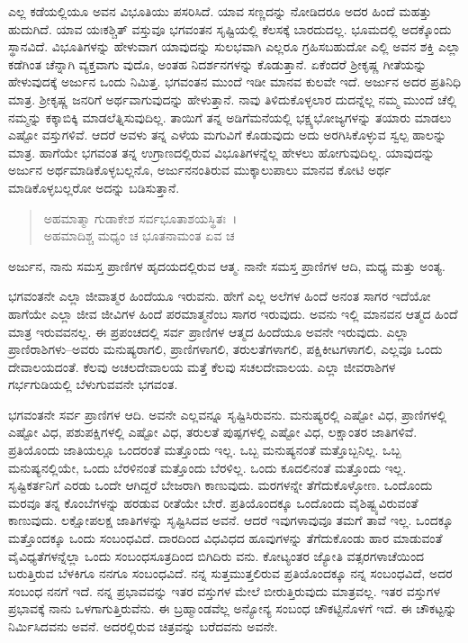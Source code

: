 ಎಲ್ಲ ಕಡೆಯಲ್ಲಿಯೂ ಅವನ ವಿಭೂತಿಯು ಪಸರಿಸಿದೆ. ಯಾವ ಸಣ್ಣದನ್ನು ನೋಡಿದರೂ ಅದರ ಹಿಂದೆ ಮಹತ್ತು ಹುದುಗಿದೆ. ಯಾವ ಯಃಕಶ್ಚಿತ್ ವಸ್ತುವೂ ಭಗವಂತನ ಸೃಷ್ಟಿಯಲ್ಲಿ ಕೆಲಸಕ್ಕೆ ಬಾರದುದಲ್ಲ. ಭೂಮದಲ್ಲಿ ಅದಕ್ಕೊಂದು ಸ್ಥಾನವಿದೆ. ವಿಭೂತಿಗಳನ್ನು ಹೇಳುವಾಗ ಯಾವುದನ್ನು ಸುಲಭವಾಗಿ ಎಲ್ಲರೂ ಗ್ರಹಿಸಬಹುದೋ ಎಲ್ಲಿ ಅವನ ಶಕ್ತಿ ಎಲ್ಲಾ ಕಡೆಗಿಂತ ಚೆನ್ನಾಗಿ ವ್ಯಕ್ತವಾಗು ವುದೊ, ಅಂತಹ ನಿದರ್ಶನಗಳನ್ನು ಕೊಡುತ್ತಾನೆ. ಏಕೆಂದರೆ ಶ‍್ರೀಕೃಷ್ಣ ಗೀತೆಯನ್ನು ಹೇಳುವುದಕ್ಕೆ ಅರ್ಜುನ ಒಂದು ನಿಮಿತ್ತ. ಭಗವಂತನ ಮುಂದೆ ಇಡೀ ಮಾನವ ಕುಲವೇ ಇದೆ. ಅರ್ಜುನ ಅದರ ಪ್ರತಿನಿಧಿ ಮಾತ್ರ. ಶ‍್ರೀಕೃಷ್ಣ ಜನರಿಗೆ ಅರ್ಥವಾಗುವುದನ್ನು ಹೇಳುತ್ತಾನೆ. ನಾವು ತಿಳಿದುಕೊಳ್ಳಲಾರ ದುದನ್ನೆಲ್ಲ ನಮ್ಮ ಮುಂದೆ ಚೆಲ್ಲಿ ನಮ್ಮನ್ನು ಕಕ್ಕಾಬಿಕ್ಕಿ ಮಾಡಲೆತ್ನಿಸುವುದಿಲ್ಲ. ತಾಯಿಗೆ ತನ್ನ ಅಡಿಗೆಮನೆಯಲ್ಲಿ ಭಕ್ಷ್ಯಭೋಜ್ಯಗಳನ್ನು ತಯಾರು ಮಾಡಲು ಎಷ್ಟೋ ವಸ್ತುಗಳಿವೆ. ಆದರೆ ಅವಳು ತನ್ನ ಎಳೆಯ ಮಗುವಿಗೆ ಕೊಡುವುದು ಅದು ಅರಗಿಸಿಕೊಳ್ಳುವ ಸ್ವಲ್ಪ ಹಾಲನ್ನು ಮಾತ್ರ. ಹಾಗೆಯೇ ಭಗವಂತ ತನ್ನ ಉಗ್ರಾಣದಲ್ಲಿರುವ ವಿಭೂತಿಗಳನ್ನೆಲ್ಲ ಹೇಳಲು ಹೋಗುವುದಿಲ್ಲ. ಯಾವುದನ್ನು ಅರ್ಜುನ ಅರ್ಥಮಾಡಿಕೊಳ್ಳಬಲ್ಲನೊ, ಅರ್ಜುನನಂತಿರುವ ಮುಕ್ಕಾಲುಪಾಲು ಮಾನವ ಕೋಟಿ ಅರ್ಥ ಮಾಡಿಕೊಳ್ಳಬಲ್ಲರೋ ಅದನ್ನು ಬಡಿಸುತ್ತಾನೆ.

\begin{verse}
ಅಹಮಾತ್ಮಾ ಗುಡಾಕೇಶ ಸರ್ವಭೂತಾಶಯಸ್ಥಿತಃ~।\\ಅಹಮಾದಿಶ್ಚ ಮಧ್ಯಂ ಚ ಭೂತನಾಮಂತ ಏವ ಚ 
\end{verse}

{\small ಅರ್ಜುನ, ನಾನು ಸಮಸ್ತ ಪ್ರಾಣಿಗಳ ಹೃದಯದಲ್ಲಿರುವ ಆತ್ಮ. ನಾನೇ ಸಮಸ್ತ ಪ್ರಾಣಿಗಳ ಆದಿ, ಮಧ್ಯ ಮತ್ತು ಅಂತ್ಯ.}

ಭಗವಂತನೇ ಎಲ್ಲಾ ಜೀವಾತ್ಮರ ಹಿಂದೆಯೂ ಇರುವನು. ಹೇಗೆ ಎಲ್ಲ ಅಲೆಗಳ ಹಿಂದೆ ಅನಂತ ಸಾಗರ ಇದೆಯೋ ಹಾಗೆಯೇ ಎಲ್ಲಾ ಜೀವ ಜೀವಿಗಳ ಹಿಂದೆ ಪರಮಾತ್ಮನೆಂಬ ಸಾಗರ ಇರುವುದು. ಅವನು ಇಲ್ಲಿ ಮಾನವನ ಆತ್ಮದ ಹಿಂದೆ ಮಾತ್ರ ಇರುವವನಲ್ಲ. ಈ ಪ್ರಪಂಚದಲ್ಲಿ ಸರ್ವ ಪ್ರಾಣಿಗಳ ಆತ್ಮದ ಹಿಂದೆಯೂ ಅವನೇ ಇರುವುದು. ಎಲ್ಲಾ ಪ್ರಾಣಿರಾಶಿಗಳು–ಅವರು ಮನುಷ್ಯರಾಗಲಿ, ಪ್ರಾಣಿಗಳಾಗಲಿ, ತರುಲತೆಗಳಾಗಲಿ, ಪಕ್ಷಿಕೀಟಗಳಾಗಲಿ, ಎಲ್ಲವೂ ಒಂದು ದೇವಾಲಯದಂತೆ. ಕೆಲವು ಅಚಲದೇವಾಲಯ ಮತ್ತೆ ಕೆಲವು ಸಚಲದೇವಾಲಯ. ಎಲ್ಲಾ ಜೀವರಾಶಿಗಳ ಗರ್ಭಗುಡಿಯಲ್ಲಿ ಬೆಳುಗುವವನೇ ಭಗವಂತ.

ಭಗವಂತನೇ ಸರ್ವ ಪ್ರಾಣಿಗಳ ಆದಿ. ಅವನೇ ಎಲ್ಲವನ್ನೂ ಸೃಷ್ಟಿಸಿರುವನು. ಮನುಷ್ಯರಲ್ಲಿ ಎಷ್ಟೋ ವಿಧ, ಪ್ರಾಣಿಗಳಲ್ಲಿ ಎಷ್ಟೋ ವಿಧ, ಪಶುಪಕ್ಷಿಗಳಲ್ಲಿ ಎಷ್ಟೋ ವಿಧ, ತರುಲತೆ ಪುಷ್ಪಗಳಲ್ಲಿ ಎಷ್ಟೋ ವಿಧ, ಲಕ್ಷಾಂತರ ಜಾತಿಗಳಿವೆ. ಪ್ರತಿಯೊಂದು ಜಾತಿಯಲ್ಲೂ ಒಂದರಂತೆ ಮತ್ತೊಂದು ಇಲ್ಲ. ಒಬ್ಬ ಮನುಷ್ಯನಂತೆ ಮತ್ತೊಬ್ಬನಿಲ್ಲ. ಒಬ್ಬ ಮನುಷ್ಯನಲ್ಲಿಯೇ, ಒಂದು ಬೆರಳಿನಂತೆ ಮತ್ತೊಂದು ಬೆರಳಿಲ್ಲ. ಒಂದು ಕೂದಲಿನಂತೆ ಮತ್ತೊಂದು ಇಲ್ಲ. ಸೃಷ್ಟಿಕರ್ತನಿಗೆ ಎರಡು ಒಂದೇ ಆಗಿದ್ದರೆ ಬೇಜರಾಗಿ ಕಾಣುವುದು. ಮರಗಳನ್ನೇ ತೆಗೆದುಕೊಳ್ಳೋಣ. ಒಂದೊಂದು ಮರವೂ ತನ್ನ ಕೊಂಬೆಗಳನ್ನು ಹರಡುವ ರೀತೆಯೇ ಬೇರೆ. ಪ್ರತಿಯೊಂದಕ್ಕೂ ಒಂದೊಂದು ವೈಶಿಷ್ಟ್ಯವಿರುವಂತೆ ಕಾಣುವುದು. ಲಕ್ಷೋಪಲಕ್ಷ ಜಾತಿಗಳನ್ನು ಸೃಷ್ಟಿಸಿದವ ಅವನೆ. ಆದರೆ ಇವುಗಳಾವುವೂ ತಮಗೆ ತಾವೆ ಇಲ್ಲ. ಒಂದಕ್ಕೂ ಮತ್ತೊಂದಕ್ಕೂ ಒಂದು ಸಂಬಂಧವಿದೆ. ದಾರದಿಂದ ವಿಧವಿಧದ ಹೂವುಗಳನ್ನು ತೆಗೆದುಕೊಂಡು ಹಾರ ಮಾಡುವಂತೆ ವೈವಿಧ್ಯತೆಗಳನ್ನೆಲ್ಲಾ ಒಂದು ಸಂಬಂಧಸೂತ್ರದಿಂದ ಬಿಗಿದಿರು ವನು. ಕೋಟ್ಯಂತರ ಜ್ಯೋತಿ ವತ್ಸರಗಳಾಚೆಯಿಂದ ಬರುತ್ತಿರುವ ಬೆಳಕಿಗೂ ನನಗೂ ಸಂಬಂಧವಿದೆ. ನನ್ನ ಸುತ್ತಮುತ್ತಲಿರುವ ಪ್ರತಿಯೊಂದಕ್ಕೂ ನನ್ನ ಸಂಬಂಧವಿದೆ, ಅದರ ಸಂಬಂಧ ನನಗೆ ಇದೆ. ನನ್ನ ಪ್ರಭಾವವನ್ನು ಇತರ ವಸ್ತುಗಳ ಮೇಲೆ ಬೀರುತ್ತಿರುವುದು ಮಾತ್ರವಲ್ಲ. ಇತರ ವಸ್ತುಗಳ ಪ್ರಭಾವಕ್ಕೆ ನಾನು ಒಳಗಾಗುತ್ತಿರುವೆನು. ಈ ಬ್ರಹ್ಮಾಂಡವೆಲ್ಲ ಅನ್ಯೋನ್ಯ ಸಂಬಂಧ ಚೌಕಟ್ಟಿನೊಳಗೆ ಇದೆ. ಈ ಚೌಕಟ್ಟನ್ನು ನಿರ್ಮಿಸಿದವನು ಅವನೆ. ಅದರಲ್ಲಿರುವ ಚಿತ್ರವನ್ನು ಬರೆದವನು ಅವನೇ.

